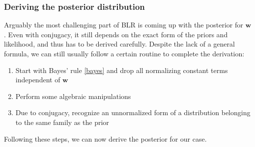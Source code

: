 \documentclass[english, 12pt, a4paper, sci, utf8, a-2b, online]{aaltothesis}
\begin{document}
\subsubsection{Deriving the posterior distribution} \label{posterior}

Arguably the most challenging part of BLR is coming up with the posterior for $\bm{w}$. Even with conjugacy, it still depends on the exact form of the priors and likelihood, and thus has to be
derived carefully. Despite the lack of a general formula, we can still usually follow a certain routine to complete the derivation:
%
\begin{enumerate}
  \item Start with Bayes' rule \eqref{bayes} and drop all normalizing constant terms independent of $\bm{w}$
  \item Perform some algebraic manipulations
  \item Due to conjugacy, recognize an unnormalized form of a distribution belonging to the same family as the prior
\end{enumerate}
%
Following these steps, we can now derive the posterior for our case.
\end{document}

